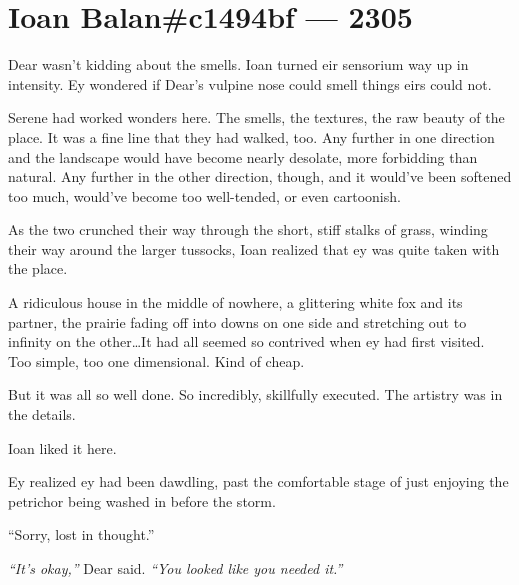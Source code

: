 

\chapter*{Ioan Balan\#c1494bf — 2305}

Dear wasn't kidding about the smells. Ioan turned eir sensorium way up in intensity. Ey wondered if Dear's vulpine nose could smell things eirs could not.

Serene had worked wonders here. The smells, the textures, the raw beauty of the place. It was a fine line that they had walked, too. Any further in one direction and the landscape would have become nearly desolate, more forbidding than natural. Any further in the other direction, though, and it would've been softened too much, would've become too well-tended, or even cartoonish.

As the two crunched their way through the short, stiff stalks of grass, winding their way around the larger tussocks, Ioan realized that ey was quite taken with the place.

A ridiculous house in the middle of nowhere, a glittering white fox and its partner, the prairie fading off into downs on one side and stretching out to infinity on the other\ldots{}It had all seemed so contrived when ey had first visited. Too simple, too one dimensional. Kind of cheap.

But it was all so well done. So incredibly, skillfully executed. The artistry was in the details.

Ioan liked it here.

Ey realized ey had been dawdling, past the comfortable stage of just enjoying the petrichor being washed in before the storm.

``Sorry, lost in thought.''

\emph{``It's okay,''} Dear said. \emph{``You looked like you needed it.''}

